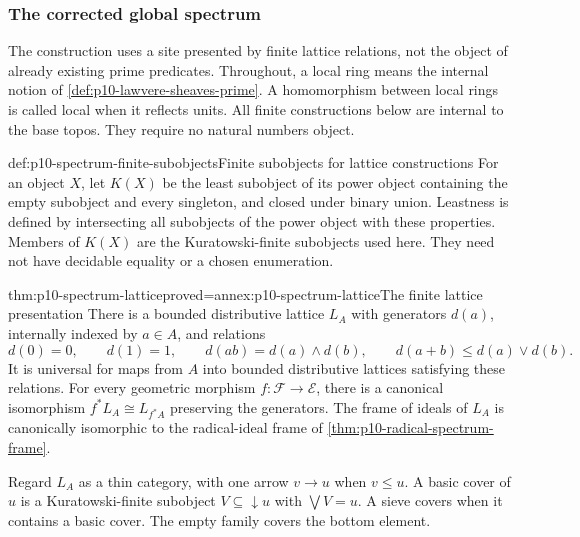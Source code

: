 \subsubsection{The corrected global spectrum}
\label{sec:p10-corrected-global-spectrum}

The construction uses a site presented by finite lattice relations,
not the object of already existing prime predicates.
Throughout, a local ring means the internal notion of
\cref{def:p10-lawvere-sheaves-prime}. A homomorphism between local rings
is called local when it reflects units.
All finite constructions below are internal to the base topos.
They require no natural numbers object.

\begin{hbdefinition}{def:p10-spectrum-finite-subobjects}{Finite subobjects for lattice constructions}
For an object \(X\), let \(K(X)\) be the least subobject of its
power object containing the empty subobject and every singleton,
and closed under binary union. Leastness is defined by intersecting
all subobjects of the power object with these properties.
Members of \(K(X)\) are the Kuratowski-finite subobjects used here.
They need not have decidable equality or a chosen enumeration.
\end{hbdefinition}

\begin{hbtheorem}{thm:p10-spectrum-lattice}{proved=annex:p10-spectrum-lattice}{The finite lattice presentation}
There is a bounded distributive lattice \(L_A\) with generators
\(d(a)\), internally indexed by \(a\in A\), and relations
\[
 d(0)=0,\qquad d(1)=1,\qquad
 d(ab)=d(a)\wedge d(b),\qquad
 d(a+b)\leq d(a)\vee d(b).
\]
It is universal for maps from \(A\) into bounded distributive lattices
satisfying these relations.
For every geometric morphism \(f:\mathcal F\to\mathcal E\),
there is a canonical isomorphism
\(f^*L_A\cong L_{f^*A}\) preserving the generators.
The frame of ideals of \(L_A\) is canonically isomorphic to the
radical-ideal frame of \cref{thm:p10-radical-spectrum-frame}.
\end{hbtheorem}

Regard \(L_A\) as a thin category, with one arrow \(v\to u\)
when \(v\leq u\). A basic cover of \(u\) is a
Kuratowski-finite subobject \(V\subseteq{\downarrow}u\) with
\(\bigvee V=u\). A sieve covers when it contains a basic cover.
The empty family covers the bottom element.

